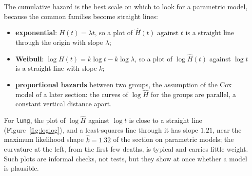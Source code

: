 \documentclass[11pt,a4paper]{article}
\numberwithin{equation}{section}
\theoremstyle{definition}
\begin{document}
The cumulative hazard is the best scale on which to look for a parametric model, because the common families become straight lines:
\begin{itemize}
\item \textbf{exponential}: $H(t) = \lambda t$, so a plot of $\hat H(t)$ against $t$ is a straight line through the origin with slope $\lambda$;
\item \textbf{Weibull}: $\log H(t) = k\log t - k\log\lambda$, so a plot of $\log\hat H(t)$ against $\log t$ is a straight line with slope $k$;
\item \textbf{proportional hazards} between two groups, the assumption of the Cox model of a later section: the curves of $\log\hat H$ for the groups are parallel, a constant vertical distance apart.
\end{itemize}
For \texttt{lung}, the plot of $\log\hat H$ against $\log t$ is close to a straight line (Figure~\ref{fig:loglog}), and a least-squares line through it has slope $1.21$, near the maximum likelihood shape $\hat k = 1.32$ of the section on parametric models; the curvature at the left, from the first few deaths, is typical and carries little weight. Such
plots are informal checks, not tests, but they show at once whether a model is plausible.
\end{document}
